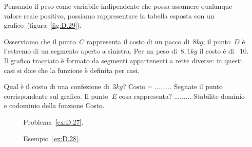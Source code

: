 \begin{soluzione}
Pensando il peso come variabile indipendente che possa assumere qualunque valore reale positivo, possiamo rappresentare la
tabella esposta con un grafico~(figura~\ref{fig:D.29}).

Osserviamo che il punto~$C$ rappresenta il costo di un pacco di~$8\unit{kg}$; il punto~$D$ è l'estremo di un segmento aperto a sinistra.
Per un peso di~$8,1\unit{kg}$ il costo è di \officialeuro~$10$.
Il grafico tracciato è formato da segmenti appartenenti a rette diverse: in questi casi si dice che la funzione è definita per casi.

Qual è il costo di una confezione di~$3\unit{kg}$? $\text{Costo}=\ldots \ldots\ldots$ Segnate il punto corrispondente sul grafico.
Il punto~$E$ cosa rappresenta? $\ldots \ldots \ldots$
Stabilite dominio e codominio della funzione Costo.
\end{soluzione}

\begin{figure}[htb]
\begin{minipage}[b]{.45\textwidth}
\centering
\caption{Problema~\ref{ex:D.27}.}\label{fig:D.29}
\end{minipage}\hfil
\begin{minipage}[b]{.45\textwidth}
\centering
\caption{Esempio~\ref{ex:D.28}.}\label{fig:D.30}
\end{minipage}
\end{figure}

